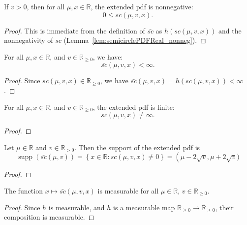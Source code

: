 \begin{lemma}
  \leanok
  \label{lem:semicirclePDF_nonneg}
  If $v > 0$, then for all $\mu, x \in \mathbb{R}$, the extended pdf is nonnegative:
  \[
      0 \le \bar{sc}(\mu,v,x).
  \]
\end{lemma}
\begin{proof}
    \leanok
    This is immediate from the definition of $\bar{sc}$ as $h(sc(\mu,v,x))$ and the nonnegativity of $sc$ (Lemma~\ref{lem:semicirclePDFReal_nonneg}).
\end{proof}

\begin{lemma}
  \leanok
  \label{lem:semicirclePDF_finite}
  For all $\mu, x \in \mathbb{R}$, and $v \in \mathbb{R}_{\ge 0}$, we have:
    $$
    \bar{sc}(\mu,v,x) < \infty.
    $$
\end{lemma}
\begin{proof}
  \leanok
Since $sc(\mu,v,x) \in \mathbb{R}_{\ge 0}$, we have $\bar{sc}(\mu,v,x) = h(sc(\mu,v,x)) < \infty$.
\end{proof}

\begin{lemma}
  \leanok
  \label{lem:semicirclePDF_ne_top}
  For all \( \mu, x \in \mathbb{R} \), and \( v \in \mathbb{R}_{\ge 0} \), the extended pdf is finite:
  \[
    \bar{sc}(\mu,v,x) \ne \infty.
  \]
\end{lemma}
\begin{proof}
  \leanok
\end{proof}

\begin{lemma}
  \leanok
  \label{lem:support_semicirclePDF}
  Let \( \mu \in \mathbb{R} \) and \( v \in \mathbb{R}_{> 0} \). Then the support of the extended pdf is
  \[
      \operatorname{supp}(\bar{sc}(\mu,v)) = \left\{ x \in \mathbb{R} : sc(\mu,v,x) \ne 0 \right\}
    = \left(\mu - 2\sqrt{v}, \mu + 2\sqrt{v})\right.
  \]
\end{lemma}
\begin{proof}
    \leanok
\end{proof}

\begin{lemma}
  \leanok
  \label{lem:measurable_semicirclePDF}
  The function \( x \mapsto \bar{sc}(\mu,v,x) \) is measurable for all \( \mu \in \mathbb{R} \), \( v \in \mathbb{R}_{\ge 0} \).
\end{lemma}
\begin{proof}
  \leanok
  Since $h$ is measurable, and $h$ is a measurable map \( \mathbb{R}_{\ge 0} \to \overline{\mathbb{R}}_{\ge 0} \), their composition is measurable.
\end{proof}

